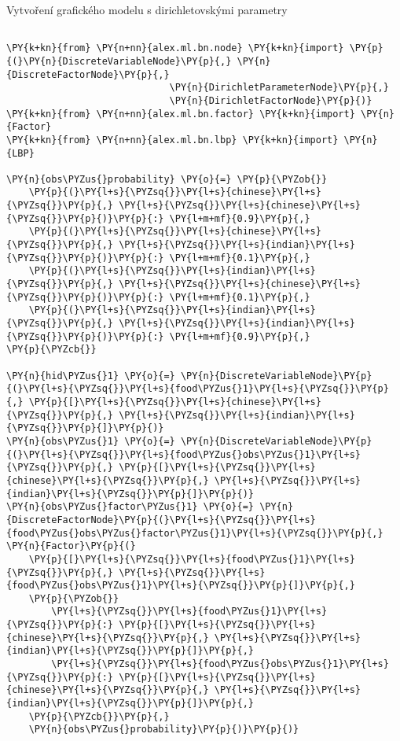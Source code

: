 \begin{example}
\caption{Vytvoření grafického modelu s dirichletovskými parametry}
\label{lst:crtep}
\begin{Verbatim}[commandchars=\\\{\}, fontsize=\relsize{-1}]

\PY{k+kn}{from} \PY{n+nn}{alex.ml.bn.node} \PY{k+kn}{import} \PY{p}{(}\PY{n}{DiscreteVariableNode}\PY{p}{,} \PY{n}{DiscreteFactorNode}\PY{p}{,}
                             \PY{n}{DirichletParameterNode}\PY{p}{,}
                             \PY{n}{DirichletFactorNode}\PY{p}{)}
\PY{k+kn}{from} \PY{n+nn}{alex.ml.bn.factor} \PY{k+kn}{import} \PY{n}{Factor}
\PY{k+kn}{from} \PY{n+nn}{alex.ml.bn.lbp} \PY{k+kn}{import} \PY{n}{LBP}

\PY{n}{obs\PYZus{}probability} \PY{o}{=} \PY{p}{\PYZob{}}
    \PY{p}{(}\PY{l+s}{\PYZsq{}}\PY{l+s}{chinese}\PY{l+s}{\PYZsq{}}\PY{p}{,} \PY{l+s}{\PYZsq{}}\PY{l+s}{chinese}\PY{l+s}{\PYZsq{}}\PY{p}{)}\PY{p}{:} \PY{l+m+mf}{0.9}\PY{p}{,}
    \PY{p}{(}\PY{l+s}{\PYZsq{}}\PY{l+s}{chinese}\PY{l+s}{\PYZsq{}}\PY{p}{,} \PY{l+s}{\PYZsq{}}\PY{l+s}{indian}\PY{l+s}{\PYZsq{}}\PY{p}{)}\PY{p}{:} \PY{l+m+mf}{0.1}\PY{p}{,}
    \PY{p}{(}\PY{l+s}{\PYZsq{}}\PY{l+s}{indian}\PY{l+s}{\PYZsq{}}\PY{p}{,} \PY{l+s}{\PYZsq{}}\PY{l+s}{chinese}\PY{l+s}{\PYZsq{}}\PY{p}{)}\PY{p}{:} \PY{l+m+mf}{0.1}\PY{p}{,}
    \PY{p}{(}\PY{l+s}{\PYZsq{}}\PY{l+s}{indian}\PY{l+s}{\PYZsq{}}\PY{p}{,} \PY{l+s}{\PYZsq{}}\PY{l+s}{indian}\PY{l+s}{\PYZsq{}}\PY{p}{)}\PY{p}{:} \PY{l+m+mf}{0.9}\PY{p}{,}
\PY{p}{\PYZcb{}}

\PY{n}{hid\PYZus{}1} \PY{o}{=} \PY{n}{DiscreteVariableNode}\PY{p}{(}\PY{l+s}{\PYZsq{}}\PY{l+s}{food\PYZus{}1}\PY{l+s}{\PYZsq{}}\PY{p}{,} \PY{p}{[}\PY{l+s}{\PYZsq{}}\PY{l+s}{chinese}\PY{l+s}{\PYZsq{}}\PY{p}{,} \PY{l+s}{\PYZsq{}}\PY{l+s}{indian}\PY{l+s}{\PYZsq{}}\PY{p}{]}\PY{p}{)}
\PY{n}{obs\PYZus{}1} \PY{o}{=} \PY{n}{DiscreteVariableNode}\PY{p}{(}\PY{l+s}{\PYZsq{}}\PY{l+s}{food\PYZus{}obs\PYZus{}1}\PY{l+s}{\PYZsq{}}\PY{p}{,} \PY{p}{[}\PY{l+s}{\PYZsq{}}\PY{l+s}{chinese}\PY{l+s}{\PYZsq{}}\PY{p}{,} \PY{l+s}{\PYZsq{}}\PY{l+s}{indian}\PY{l+s}{\PYZsq{}}\PY{p}{]}\PY{p}{)}
\PY{n}{obs\PYZus{}factor\PYZus{}1} \PY{o}{=} \PY{n}{DiscreteFactorNode}\PY{p}{(}\PY{l+s}{\PYZsq{}}\PY{l+s}{food\PYZus{}obs\PYZus{}factor\PYZus{}1}\PY{l+s}{\PYZsq{}}\PY{p}{,} \PY{n}{Factor}\PY{p}{(}
    \PY{p}{[}\PY{l+s}{\PYZsq{}}\PY{l+s}{food\PYZus{}1}\PY{l+s}{\PYZsq{}}\PY{p}{,} \PY{l+s}{\PYZsq{}}\PY{l+s}{food\PYZus{}obs\PYZus{}1}\PY{l+s}{\PYZsq{}}\PY{p}{]}\PY{p}{,}
    \PY{p}{\PYZob{}}
        \PY{l+s}{\PYZsq{}}\PY{l+s}{food\PYZus{}1}\PY{l+s}{\PYZsq{}}\PY{p}{:} \PY{p}{[}\PY{l+s}{\PYZsq{}}\PY{l+s}{chinese}\PY{l+s}{\PYZsq{}}\PY{p}{,} \PY{l+s}{\PYZsq{}}\PY{l+s}{indian}\PY{l+s}{\PYZsq{}}\PY{p}{]}\PY{p}{,}
        \PY{l+s}{\PYZsq{}}\PY{l+s}{food\PYZus{}obs\PYZus{}1}\PY{l+s}{\PYZsq{}}\PY{p}{:} \PY{p}{[}\PY{l+s}{\PYZsq{}}\PY{l+s}{chinese}\PY{l+s}{\PYZsq{}}\PY{p}{,} \PY{l+s}{\PYZsq{}}\PY{l+s}{indian}\PY{l+s}{\PYZsq{}}\PY{p}{]}\PY{p}{,}
    \PY{p}{\PYZcb{}}\PY{p}{,}
    \PY{n}{obs\PYZus{}probability}\PY{p}{)}\PY{p}{)}


\end{Verbatim}
\end{example}
